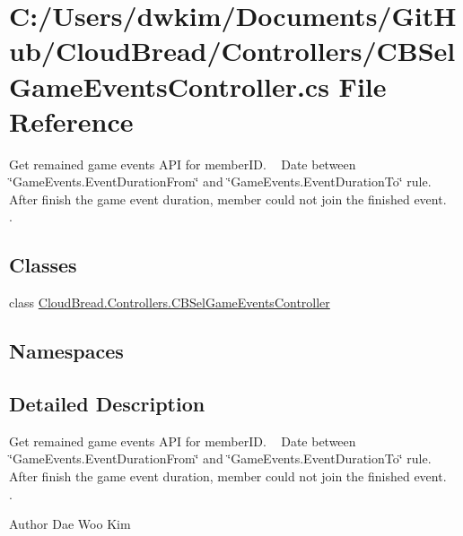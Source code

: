 \hypertarget{a00143}{}\section{C\+:/\+Users/dwkim/\+Documents/\+Git\+Hub/\+Cloud\+Bread/\+Controllers/\+C\+B\+Sel\+Game\+Events\+Controller.cs File Reference}
\label{a00143}


Get remained game events A\+PI for member\+ID. ~\newline
Date between \char`\"{}\+Game\+Events.\+Event\+Duration\+From\char`\"{} and \char`\"{}\+Game\+Events.\+Event\+Duration\+To\char`\"{} rule. ~\newline
After finish the game event duration, member could not join the finished event. ~\newline
.  


\subsection*{Classes}
\begin{DoxyCompactItemize}
\item 
class \hyperlink{a00031}{Cloud\+Bread.\+Controllers.\+C\+B\+Sel\+Game\+Events\+Controller}
\end{DoxyCompactItemize}
\subsection*{Namespaces}
\begin{DoxyCompactItemize}
\end{DoxyCompactItemize}


\subsection{Detailed Description}
Get remained game events A\+PI for member\+ID. ~\newline
Date between \char`\"{}\+Game\+Events.\+Event\+Duration\+From\char`\"{} and \char`\"{}\+Game\+Events.\+Event\+Duration\+To\char`\"{} rule. ~\newline
After finish the game event duration, member could not join the finished event. ~\newline
. 

\begin{DoxyAuthor}{Author}
Dae Woo Kim 
\end{DoxyAuthor}

